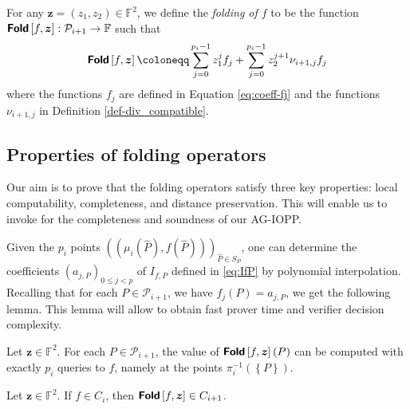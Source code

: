 \documentclass[a4paper,USenglish,autoref]{lipics-v2021}
\renewcommand\hat{\widehat}
\newcommand\F{\mathbb{F}}
\newcommand\fold[1]{\textsf{\textbf{Fold}}\left[#1\right]}
\renewcommand{\hat}{\widehat}
\renewcommand{\vec}[1]{\boldsymbol{#1}}
\newcommand{\set}[1]{\left\{#1\right\}}
\newcommand\bfz{{\vec{z}}}
\newcommand\calP{\mathcal{P}}
\newcommand\mydef{\coloneqq}
\begin{document}
\begin{definition}\label{def:folding-operator}
	For any $\bfz=(z_1,z_2) \in \F^2$, we define the \emph{folding of $f$} to be the function ${\fold{f, \bfz} : \mathcal P_{i+1} \rightarrow \F}$ such that
	\begin{equation}\label{eq:fold-via-interp}
		\fold{f, \bfz} \mydef\sum_{j=0}^{p_i-1} z_1^j f_j + \sum_{j=0}^{p_i-1} z_2^{j+1} \nu_{i+1,j} f_j
	\end{equation}    
	where the functions $f_j$ are defined in Equation \eqref{eq:coeff-fj} and the functions $\nu_{i+1,j}$ in Definition \ref{def-div_compatible}.
\end{definition}

\subsection{Properties of folding operators}
Our aim is to prove that the folding operators satisfy three key properties: local computability, completeness, and distance preservation. This will enable us to invoke \cite[Theorem~1]{ABN21} for the completeness and soundness of our AG-IOPP.


Given the $p_i$ points $((\mu_i(\hat P), f(\hat P)))_{\hat P \in S_P}$, one can determine the coefficients $(a_{j, P})_{0 \le j < p}$ of $I_{f, P}$ defined in \eqref{eq:IfP} by polynomial interpolation. Recalling that for each $P \in \calP_{i + 1}$, we have ${f_j(P) = a_{j, P}}$, we get the following lemma. This lemma will allow to obtain fast prover time and verifier decision complexity.

\begin{lemma}[Locality]\label{lem:locality}
	Let $\bfz \in \F^2$. For each $P \in \calP_{i+1}$, the value of $\fold{f, \bfz}(P)$ can be computed with exactly $p_i$ queries to $f$, namely at the points $\pi_i^{-1}(\set{P})$.
\end{lemma}

\begin{proposition}[Completeness]\label{prop:folding-completeness}
	Let $\bfz \in \F^2$. If $f \in C_i$, then $\fold{f,\bfz} \in C_{i+1}$.
\end{proposition}
\end{document}
